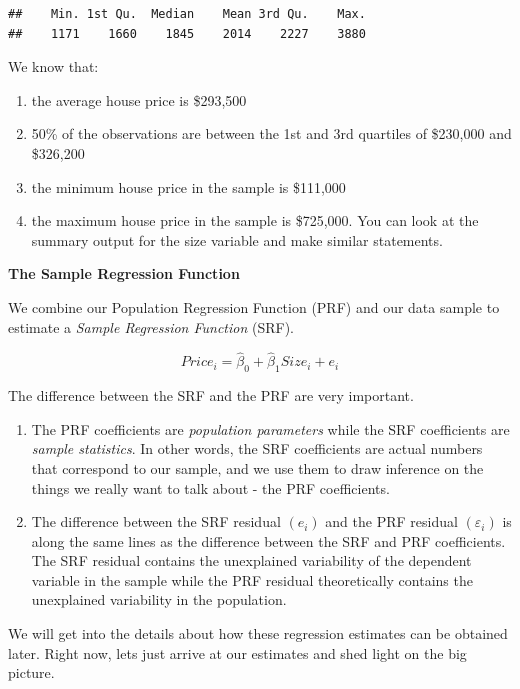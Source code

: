 \documentclass[
]{book}
\begin{document}
\begin{verbatim}
##    Min. 1st Qu.  Median    Mean 3rd Qu.    Max. 
##    1171    1660    1845    2014    2227    3880
\end{verbatim}

We know that:

\begin{enumerate}
\def\labelenumi{\arabic{enumi}.}
\item
  the average house price is \$293,500
\item
  50\% of the observations are between the 1st and 3rd quartiles of \$230,000 and \$326,200
\item
  the minimum house price in the sample is \$111,000
\item
  the maximum house price in the sample is \$725,000. You can look at the summary output for the size variable and make similar statements.
\end{enumerate}

\textbf{The Sample Regression Function}

We combine our Population Regression Function (PRF) and our data sample to estimate a \emph{Sample Regression Function} (SRF).

\[Price_i=\hat{\beta}_0+\hat{\beta}_1Size_i+e_i\]

The difference between the SRF and the PRF are very important.

\begin{enumerate}
\def\labelenumi{\arabic{enumi}.}
\item
  The PRF coefficients are \emph{population parameters} while the SRF coefficients are \emph{sample statistics}. In other words, the SRF coefficients are actual numbers that correspond to our sample, and we use them to draw inference on the things we really want to talk about - the PRF coefficients.
\item
  The difference between the SRF residual \((e_i)\) and the PRF residual \((\varepsilon_i)\) is along the same lines as the difference between the SRF and PRF coefficients. The SRF residual contains the unexplained variability of the dependent variable in the sample while the PRF residual theoretically contains the unexplained variability in the population.
\end{enumerate}

We will get into the details about how these regression estimates can be obtained later. Right now, lets just arrive at our estimates and shed light on the big picture.
\end{document}
